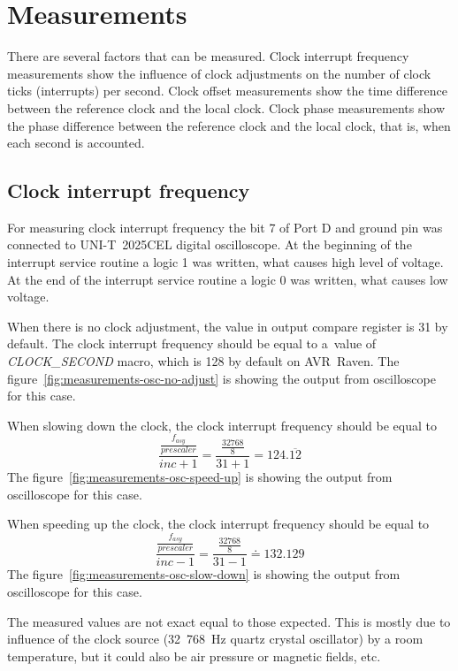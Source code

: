 
\chapter{Measurements}\label{chap:measurements}
There are several factors that can be measured.
Clock interrupt frequency measurements show the influence of clock adjustments
on the number of clock ticks (interrupts) per second.
Clock offset measurements show the time difference between the reference clock and
the local clock.
Clock phase measurements show the phase difference between the reference clock and
the local clock, that is, when each second is accounted.

\section{Clock interrupt frequency}
For measuring clock interrupt frequency the bit 7 of Port D
and ground pin was connected to UNI-T~2025CEL digital oscilloscope.
At the beginning of the interrupt service routine a logic 1 was written,
what causes high level of voltage.
At the end of the interrupt service routine a logic 0 was written,
what causes low voltage.

When there is no clock adjustment, the value in output compare register is 31 by default.
The clock interrupt frequency
should be equal to a~value of {\it{CLOCK\_SECOND}} macro, which is 128 by default on AVR~Raven.
The figure~\ref{fig:measurements-osc-no-adjust} is showing the output from oscilloscope
for this case.

When slowing down the clock, the clock interrupt frequency
should be equal to
$$\frac{\frac{f_{asy}}{prescaler}}{inc + 1} = \frac{\frac{32768}{8}}{31+1} = 124.\overline{12}$$
The figure~\ref{fig:measurements-osc-speed-up} is showing the output from oscilloscope
for this case.

When speeding up the clock, the clock interrupt frequency
should be equal to
$$\frac{\frac{f_{asy}}{prescaler}}{inc - 1} = \frac{\frac{32768}{8}}{31-1} \doteq 132.129$$
The figure~\ref{fig:measurements-osc-slow-down} is showing the output from oscilloscope
for this case.

The measured values are not exact equal to those expected.
This is mostly due to influence of the clock source
(32~768~Hz quartz crystal oscillator) by a room temperature,
but it could also be air pressure or magnetic fields, etc.

